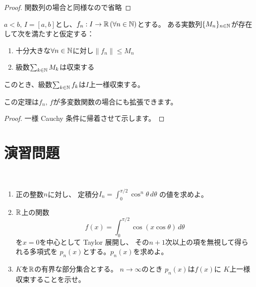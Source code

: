 \documentclass[report]{jlreq}
\begin{document}
\begin{proof}
    関数列の場合と同様なので省略
\end{proof}

\begin{theorem}
    $a<b,\, I=[a,b]$とし、$f_n: I\to\mathbb{R}\,(\forall n \in \mathbb{N})$とする。
    ある実数列$\{M_n\}_{n\in\mathbb{N}}$が存在して次を満たすと仮定する：
    \begin{enumerate}
        \item 十分大きな$\forall n\in\mathbb{N}$に対し$\| f_n \| \le M_n$
        \item 級数$\sum_{k\in\mathbb{N}} M_k$は収束する
    \end{enumerate}
    このとき、級数$\sum_{k\in\mathbb{N}} f_k$は$I$上一様収束する。
\end{theorem}

この定理は$f_n,\, f$が多変数関数の場合にも拡張できます。

\begin{proof}
    一様 Cauchy 条件に帰着させて示します。
\end{proof}

%
\newpage
\section{演習問題}

\begin{problem}[東大数理 2006A]
    ~
    \begin{enumerate}
        \item 正の整数$n$に対し、
            定積分$I_n = \int_0^{\pi / 2} \cos^n \theta \, d\theta$
            の値を求めよ。
        \item $\mathbb{R}$上の関数
            \begin{equation}
                f(x) = \int_0^{\pi / 2} \cos(x \cos \theta) \, d\theta
            \end{equation}
            を$x = 0$を中心として Taylor 展開し、
            その$n + 1$次以上の項を無視して得られる多項式を
            $p_n(x)$とする。$p_n(x)$を求めよ。
        \item $K$を$\mathbb{R}$の有界な部分集合とする。
            $n \to \infty$のとき
            $p_n(x)$は$f(x)$に
            $K$上一様収束することを示せ。
    \end{enumerate}
\end{problem}
\end{document}
